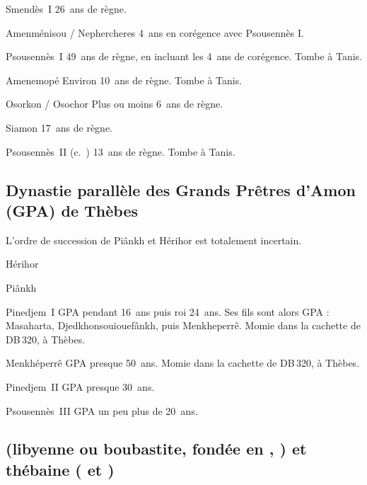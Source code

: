
\begin{listerois}
  \item [Smendès~I\ier] \num{26}~ans de règne.
  \item [Amenménisou / Nephercheres] \num{4}~ans en corégence avec 
        Psousennès I\ier.
  \item [Psousennès~I\ier] \num{49}~ans de règne, en incluant les 
        \num{4}~ans de corégence. Tombe à Tanis.
  \item [Amenemopé \datation{(c.~\anorange{993}{984})}] 
        Environ \num{10}~ans de règne. 
        Tombe à Tanis.
  \item [Osorkon / Osochor] Plus ou moins \num{6}~ans de règne.
  \item [Siamon] \num{17}~ans de règne.
  \item [Psousennès~II] (c.~) \num{13}~ans de 
        règne. Tombe à Tanis.
\end{listerois}

\subsection[Dynastie des GPA de Thèbes]{Dynastie parallèle des Grands 
            Prêtres d'Amon (GPA) de Thèbes}

L'ordre de succession de Piânkh et Hérihor est totalement incertain.

\begin{listerois}
  \item [Hérihor]
  \item [Piânkh]
  \item [Pinedjem~I\ier \datation{(c.~\anorange{1070}{1032})}] 
        GPA pendant \num{16}~ans puis roi \num{24}~ans. Ses fils sont 
        alors GPA : Masaharta, Djedkhonsouiouefânkh, puis Menkheperrê.
        Momie dans la cachette de \DeB DB\,320, à Thèbes.
  \item [Menkhéperrê \datation{(c.~\anorange{1045}{992})}] 
        GPA presque \num{50}~ans.
        Momie dans la cachette de \DeB DB\,320, à Thèbes.
  \item [Pinedjem~II] GPA presque \num{30}~ans.
  \item [Psousennès~III] GPA un peu plus de \num{20}~ans.

\end{listerois}

\subsection[\texorpdfstring{\dynlist{xxii}{xxiii}}
                           {XXIIe et XXIIIe dynasties}]
           { (libyenne ou boubastite, fondée en , 
            \XIIA) et  \og thébaine \fg (\XIIB{} et \XIIC)}

